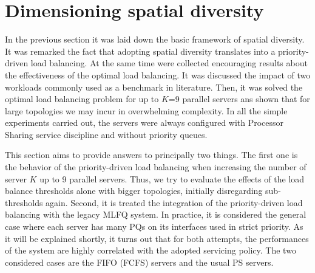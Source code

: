 \section{Dimensioning spatial diversity}
In the previous section it was laid down the basic framework of spatial diversity. It was remarked the fact that adopting spatial diversity translates into a priority-driven load balancing. At the same time were collected encouraging results about the effectiveness of the optimal load balancing. It was discussed the impact of two workloads commonly used as a benchmark in literature. Then, it was solved the optimal load balancing problem for up to $K$=9 parallel servers ans shown that for large topologies we may incur in overwhelming complexity. In all the simple experiments carried out, the servers were always configured with Processor Sharing service discipline and without priority queues.

This section aims to provide answers to principally two things. The first one is the behavior of the priority-driven load balancing when increasing the number of server $K$ up to 9 parallel servers. Thus, we try to evaluate the effects of the load balance thresholds alone with bigger topologies, initially disregarding sub-thresholds again. Second, it is treated the integration of the priority-driven load balancing with the legacy MLFQ system. In practice, it is considered the general case where each server has many PQs on its interfaces used in strict priority. As it will be explained shortly, it turns out that for both attempts, the performances of the system are highly correlated with the adopted servicing policy. The two considered cases are the FIFO (FCFS) servers and the usual PS servers. 

